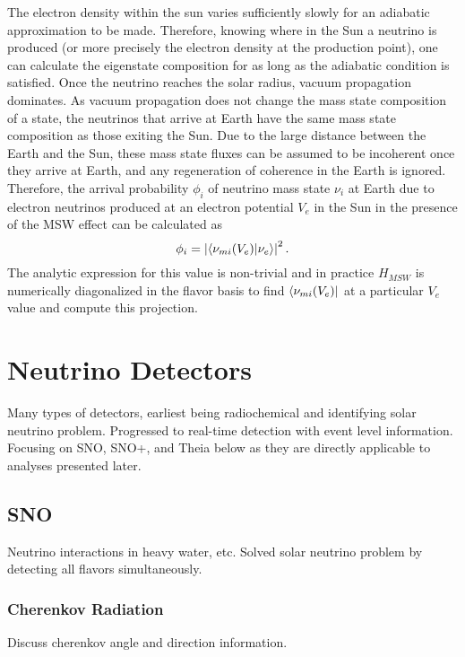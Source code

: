 The electron density within the sun varies sufficiently slowly for an adiabatic approximation to be made.
Therefore, knowing where in the Sun a neutrino is produced (or more precisely the electron density at the production point), one can calculate the eigenstate composition for as long as the adiabatic condition is satisfied.
Once the neutrino reaches the solar radius, vacuum propagation dominates. 
As vacuum propagation does not change the mass state composition of a state, the neutrinos that arrive at Earth have the same mass state composition as those exiting the Sun.
Due to the large distance between the Earth and the Sun, these mass state fluxes can be assumed to be incoherent once they arrive at Earth, and any regeneration of coherence in the Earth is ignored.
Therefore, the arrival probability $\phi_i$ of neutrino mass state $\nu_i$ at Earth due to electron neutrinos produced at an electron potential $V_e$ in the Sun in the presence of the MSW effect can be calculated as
\begin{equation}
\phi_i = \left| \braket{\nu_{m i}(V_e)}{\nu_e} \right|^2.
\label{rawflux}
\end{equation}
The analytic expression for this value is non-trivial and in practice $H_{MSW}$ is numerically diagonalized in the flavor basis to find $\bra{\nu_{m i}(V_e)}$ at a particular $V_e$ value and compute this projection.

\chapter{Neutrino Detectors}
\label{ch:detectors}

Many types of detectors, earliest being radiochemical and identifying solar neutrino problem.
Progressed to real-time detection with event level information.
Focusing on SNO, SNO+, and Theia below as they are directly applicable to analyses presented later.

\section{SNO}

Neutrino interactions in heavy water, etc.
Solved solar neutrino problem by detecting all flavors simultaneously.

\subsection{Cherenkov Radiation}

Discuss cherenkov angle and direction information.

